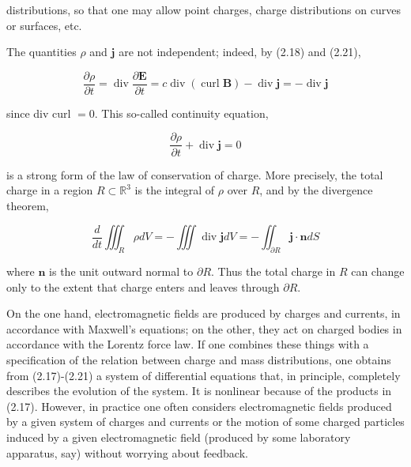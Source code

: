\documentclass[10pt, letterpaper]{article}
\begin{document}
distributions, so that one may allow point charges, charge distributions on curves or surfaces, etc.

The quantities $\rho$ and $\mathbf{j}$ are not independent; indeed, by (2.18) and (2.21),

$$
\frac{\partial \rho}{\partial t}=\operatorname{div} \frac{\partial \mathbf{E}}{\partial t}=c \operatorname{div}(\operatorname{curl} \mathbf{B})-\operatorname{div} \mathbf{j}=-\operatorname{div} \mathbf{j}
$$

since div curl $=0$. This so-called continuity equation,

$$
\frac{\partial \rho}{\partial t}+\operatorname{div} \mathbf{j}=0
$$

is a strong form of the law of conservation of charge. More precisely, the total charge in a region $R \subset \mathbb{R}^{3}$ is the integral of $\rho$ over $R$, and by the divergence theorem,

$$
\frac{d}{d t} \iiint_{R} \rho d V=-\iiint \operatorname{div} \mathbf{j} d V=-\iint_{\partial R} \mathbf{j} \cdot \mathbf{n} d S
$$

where $\mathbf{n}$ is the unit outward normal to $\partial R$. Thus the total charge in $R$ can change only to the extent that charge enters and leaves through $\partial R$.

On the one hand, electromagnetic fields are produced by charges and currents, in accordance with Maxwell's equations; on the other, they act on charged bodies in accordance with the Lorentz force law. If one combines these things with a specification of the relation between charge and mass distributions, one obtains from (2.17)-(2.21) a system of differential equations that, in principle, completely describes the evolution of the system. It is nonlinear because of the products in (2.17). However, in practice one often considers electromagnetic fields produced by a given system of charges and currents or the motion of some charged particles induced by a given electromagnetic field (produced by some laboratory apparatus, say) without worrying about feedback.
\end{document}
